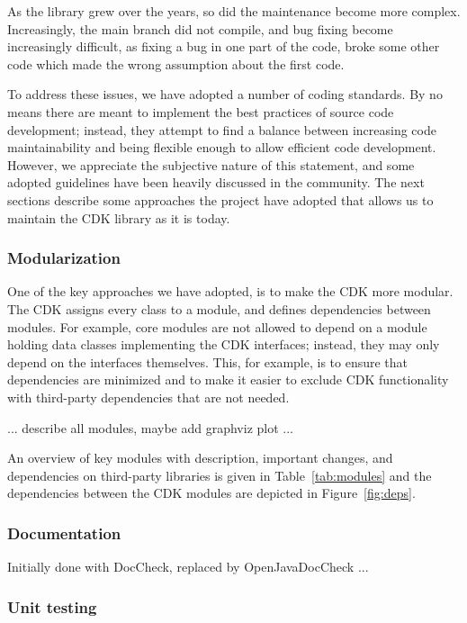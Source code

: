 \documentclass[10pt]{bmcart}
\begin{document}
As the library grew over the years, so did the maintenance become more complex. Increasingly,
the main branch did not compile, and bug fixing become increasingly difficult, as fixing a bug
in one part of the code, broke some other code which made the wrong assumption about the first
code.

To address these issues, we have adopted a number of coding standards. By no means there are
meant to implement the best practices of source code development; instead, they attempt to find
a balance between increasing code maintainability and being flexible enough to allow efficient
code development. However, we appreciate the subjective nature of this statement, and some
adopted guidelines have been heavily discussed in the community.
The next sections describe some approaches the project have adopted that allows us to
maintain the CDK library as it is today. 

  \subsubsection*{Modularization}
  
One of the key approaches we have adopted, is to make the CDK more modular. The CDK assigns
every class to a module, and defines dependencies between modules. For example, core modules
are not allowed to depend on a module holding data classes implementing the CDK interfaces;
instead, they may only depend on the interfaces themselves. This, for example, is to ensure
that dependencies are minimized and to make it easier to exclude CDK functionality with
third-party dependencies that are not needed.

... describe all modules, maybe add graphviz plot ...

An overview of key modules with description, important changes, and dependencies
on third-party libraries is given in Table~\ref{tab:modules} and the dependencies
between the CDK modules are depicted in Figure~\ref{fig:deps}.

  \subsubsection*{Documentation}

  Initially done with DocCheck, replaced by OpenJavaDocCheck ...

  \subsubsection*{Unit testing}
\end{document}
